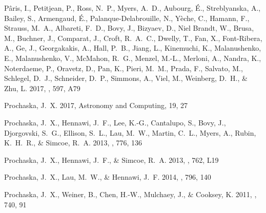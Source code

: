\documentclass[iop]{emulateapj}
\begin{document}
\begin{thebibliography}{46}
{P{\^a}ris}, I., {Petitjean}, P., {Ross}, N.~P., {Myers}, A.~D., {Aubourg},
  {\'E}., {Streblyanska}, A., {Bailey}, S., {Armengaud}, {\'E}.,
  {Palanque-Delabrouille}, N., {Y{\`e}che}, C., {Hamann}, F., {Strauss}, M.~A.,
  {Albareti}, F.~D., {Bovy}, J., {Bizyaev}, D., {Niel Brandt}, W., {Brusa}, M.,
  {Buchner}, J., {Comparat}, J., {Croft}, R.~A.~C., {Dwelly}, T., {Fan}, X.,
  {Font-Ribera}, A., {Ge}, J., {Georgakakis}, A., {Hall}, P.~B., {Jiang}, L.,
  {Kinemuchi}, K., {Malanushenko}, E., {Malanushenko}, V., {McMahon}, R.~G.,
  {Menzel}, M.-L., {Merloni}, A., {Nandra}, K., {Noterdaeme}, P., {Oravetz},
  D., {Pan}, K., {Pieri}, M.~M., {Prada}, F., {Salvato}, M., {Schlegel}, D.~J.,
  {Schneider}, D.~P., {Simmons}, A., {Viel}, M., {Weinberg}, D.~H., \& {Zhu},
  L. 2017, \aap, 597, A79

{Prochaska}, J.~X. 2017, Astronomy and Computing, 19, 27

{Prochaska}, J.~X., {Hennawi}, J.~F., {Lee}, K.-G., {Cantalupo}, S., {Bovy},
  J., {Djorgovski}, S.~G., {Ellison}, S.~L., {Lau}, M.~W., {Martin}, C.~L.,
  {Myers}, A., {Rubin}, K.~H.~R., \& {Simcoe}, R.~A. 2013{}, \apj,
  776, 136

{Prochaska}, J.~X., {Hennawi}, J.~F., \& {Simcoe}, R.~A. 2013{},
  \apjl, 762, L19

{Prochaska}, J.~X., {Lau}, M.~W., \& {Hennawi}, J.~F. 2014, \apj, 796, 140

{Prochaska}, J.~X., {Weiner}, B., {Chen}, H.-W., {Mulchaey}, J., \& {Cooksey},
  K. 2011, \apj, 740, 91


\end{thebibliography}
\end{document}

